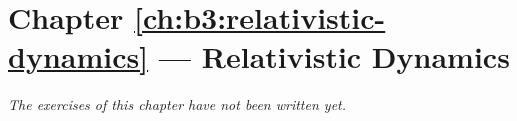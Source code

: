\section*{Chapter \ref{ch:b3:relativistic-dynamics} --- Relativistic Dynamics}


\emph{The exercises of this chapter have not been written yet.}
